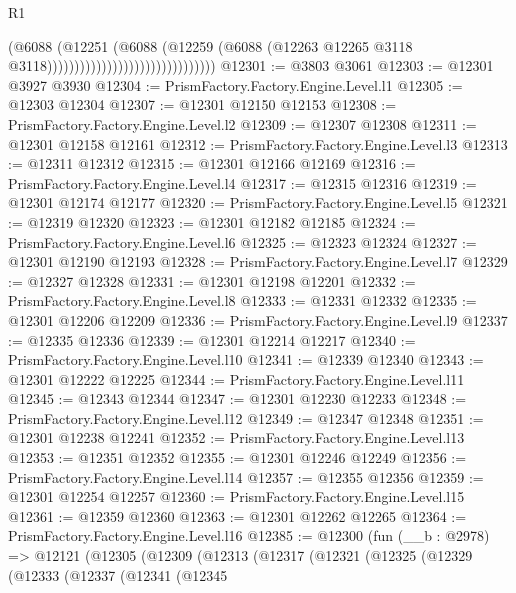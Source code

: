 \begin{lexlean}{R1}
\begin{coremodule}
                                                      (@6088
                                                        (@12251
                                                          (@6088
                                                            (@12259
                                                              (@6088
                                                                (@12263
                                                                  @12265
                                                                  @3118
                                                                  @3118)))))))))))))))))))))))))))))))
@12301 := @3803 @3061
@12303 := @12301 @3927 @3930
@12304 := PrismFactory.Factory.Engine.Level.l1
@12305 := @12303 @12304
@12307 := @12301 @12150 @12153
@12308 := PrismFactory.Factory.Engine.Level.l2
@12309 := @12307 @12308
@12311 := @12301 @12158 @12161
@12312 := PrismFactory.Factory.Engine.Level.l3
@12313 := @12311 @12312
@12315 := @12301 @12166 @12169
@12316 := PrismFactory.Factory.Engine.Level.l4
@12317 := @12315 @12316
@12319 := @12301 @12174 @12177
@12320 := PrismFactory.Factory.Engine.Level.l5
@12321 := @12319 @12320
@12323 := @12301 @12182 @12185
@12324 := PrismFactory.Factory.Engine.Level.l6
@12325 := @12323 @12324
@12327 := @12301 @12190 @12193
@12328 := PrismFactory.Factory.Engine.Level.l7
@12329 := @12327 @12328
@12331 := @12301 @12198 @12201
@12332 := PrismFactory.Factory.Engine.Level.l8
@12333 := @12331 @12332
@12335 := @12301 @12206 @12209
@12336 := PrismFactory.Factory.Engine.Level.l9
@12337 := @12335 @12336
@12339 := @12301 @12214 @12217
@12340 := PrismFactory.Factory.Engine.Level.l10
@12341 := @12339 @12340
@12343 := @12301 @12222 @12225
@12344 := PrismFactory.Factory.Engine.Level.l11
@12345 := @12343 @12344
@12347 := @12301 @12230 @12233
@12348 := PrismFactory.Factory.Engine.Level.l12
@12349 := @12347 @12348
@12351 := @12301 @12238 @12241
@12352 := PrismFactory.Factory.Engine.Level.l13
@12353 := @12351 @12352
@12355 := @12301 @12246 @12249
@12356 := PrismFactory.Factory.Engine.Level.l14
@12357 := @12355 @12356
@12359 := @12301 @12254 @12257
@12360 := PrismFactory.Factory.Engine.Level.l15
@12361 := @12359 @12360
@12363 := @12301 @12262 @12265
@12364 := PrismFactory.Factory.Engine.Level.l16
@12385 := @12300
    (fun (__b : @2978) =>
    @12121
      (@12305
        (@12309
          (@12313
            (@12317
              (@12321
                (@12325
                  (@12329
                    (@12333
                      (@12337
                        (@12341
                          (@12345

\end{coremodule}
\end{lexlean}

